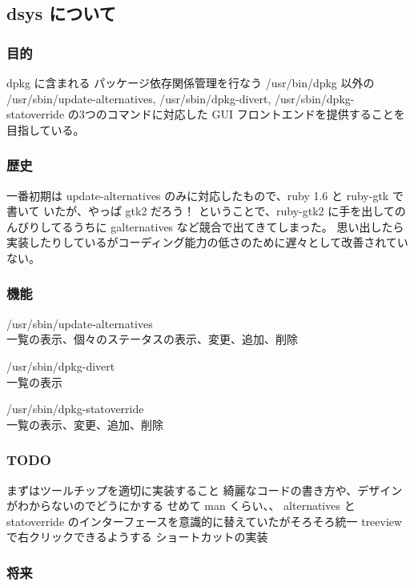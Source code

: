 \documentclass[mingoth,a4paper]{jsarticle}
\begin{document}
\subsection{dsys について}

\subsubsection{目的}

   dpkg に含まれる パッケージ依存関係管理を行なう /usr/bin/dpkg 以外の
   /usr/sbin/update-alternatives, /usr/sbin/dpkg-divert, /usr/sbin/dpkg-statoverride
   の3つのコマンドに対応した GUI フロントエンドを提供することを目指している。

\subsubsection{歴史}

   一番初期は update-alternatives のみに対応したもので、ruby 1.6 と ruby-gtk で書いて
   いたが、やっぱ gtk2 だろう！ ということで、ruby-gtk2 に手を出してのんびりしてるうちに
   galternatives など競合で出てきてしまった。
   思い出したら実装したりしているがコーディング能力の低さのために遅々として改善されていない。

\subsubsection{機能}

   /usr/sbin/update-alternatives\\
     一覧の表示、個々のステータスの表示、変更、追加、削除

   /usr/sbin/dpkg-divert\\
     一覧の表示

   /usr/sbin/dpkg-statoverride\\
     一覧の表示、変更、追加、削除

\subsubsection{TODO}

     まずはツールチップを適切に実装すること
     綺麗なコードの書き方や、デザインがわからないのでどうにかする
     せめて man くらい、、
     alternatives と statoverride のインターフェースを意識的に替えていたがそろそろ統一
     treeview で右クリックできるようする
     ショートカットの実装

\subsubsection{将来}
\end{document}
